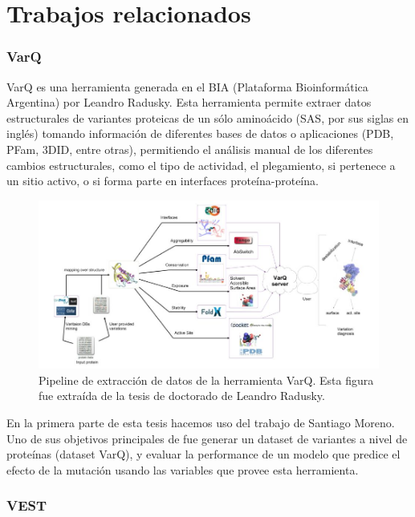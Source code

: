 \newpage


\section{Trabajos relacionados}

\subsubsection{VarQ \cite{Radusky2017}}

VarQ es una herramienta generada en el BIA (Plataforma Bioinformática Argentina) por Leandro Radusky. Esta herramienta permite extraer datos estructurales de variantes proteicas de un sólo aminoácido (SAS, por sus siglas en inglés) tomando información de diferentes bases de datos o aplicaciones (PDB, PFam, 3DID, entre otras), permitiendo el análisis manual de los diferentes cambios estructurales, como el tipo de actividad, el plegamiento, si pertenece a un sitio activo, o si forma parte en interfaces proteína-proteína. 

\begin{figure}[H]
    \centering
    \includegraphics[scale=0.45]{documents/latex/figures/1/pipeline.png}
    \caption{Pipeline de extracción de datos de la herramienta VarQ. Esta figura fue extraída de la tesis de doctorado de Leandro Radusky.}
    \label{fig:varq_pipeline}
\end{figure}

En la primera parte de esta tesis hacemos uso del trabajo de Santiago Moreno. Uno de sus objetivos principales de fue generar un dataset de variantes a nivel de proteínas (dataset VarQ), y evaluar la performance de un modelo que predice el efecto de la mutación usando las variables que provee esta herramienta. 

\subsubsection{VEST \cite{Carter2013}}

